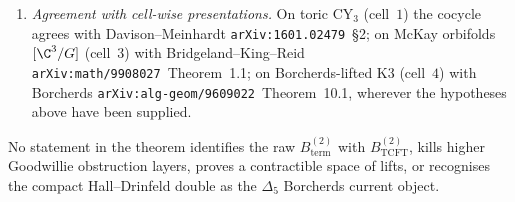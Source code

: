 \begin{theorem}
\begin{enumerate}[leftmargin=2em]
 problem, not a consequence of Bondal--Orlov alone.
 \item \emph{Agreement with cell-wise presentations.} On toric
 CY$_{3}$ (cell~$1$) the cocycle agrees with
 Davison--Meinhardt \texttt{arXiv:1601.02479}~\S 2; on McKay orbifolds
 $[\C^{3}/G]$ (cell~$3$) with Bridgeland--King--Reid
 \texttt{arXiv:math/9908027}~Theorem~1.1; on Borcherds-lifted K3
 (cell~$4$) with Borcherds \texttt{arXiv:alg-geom/9609022}~Theorem~10.1,
 wherever the hypotheses above have been supplied.
\end{enumerate}
No statement in the theorem identifies the raw
\(B^{(2)}_{\mathrm{term}}\) with \(B^{(2)}_{\mathrm{TCFT}}\), kills
higher Goodwillie obstruction layers, proves a contractible space of
lifts, or recognises the compact Hall--Drinfeld double as the
\(\Delta_5\) Borcherds current object.
\end{theorem}

